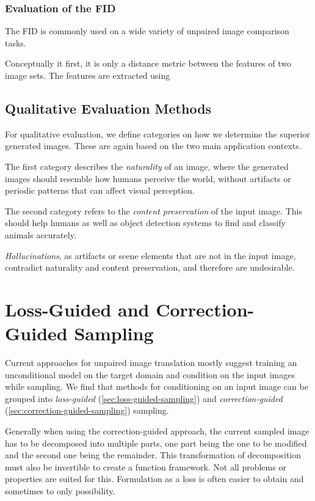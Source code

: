 \subsubsection*{Evaluation of the FID}
\label{sec:evaluate-fid}

The FID is commonly used on a wide variety of unpaired image comparison tasks.

Conceptually it first, it is only a distance metric between the features of two image sets.
The features are extracted using


\subsection{Qualitative Evaluation Methods}
For qualitative evaluation, we define categories on how we determine the superior generated images. These are again based on the two main application contexts.

The first category describes the \textit{naturality} of an image, where the generated images should resemble how humans perceive the world, without artifacts or periodic patterns that can affect visual perception.

The second category refers to the \textit{content preservation} of the input image. This should help humans as well as object detection systems to find and classify animals accurately.

\textit{Hallucinations}, as artifacts or scene elements that are not in the input image, contradict naturality and content preservation, and therefore are undesirable.

\section{Loss-Guided and Correction-Guided Sampling}
Current approaches for unpaired image translation mostly suggest training an unconditional model on the target domain
and condition on the input images while sampling.
We find that methods for conditioning on an input image can be grouped into \textit{loss-guided} (\autoref{sec:loss-guided-sampling}) and \textit{correction-guided} (\autoref{sec:correction-guided-sampling}) sampling.

Generally when using the correction-guided approach, the current sampled image has to be decomposed into multiple parts,
one part being the one to be modified and the second one being the remainder.
This transformation of decomposition must also be invertible to create a function framework.
Not all problems or properties are suited for this.
Formulation as a loss is often easier to obtain and sometimes to only possibility.

